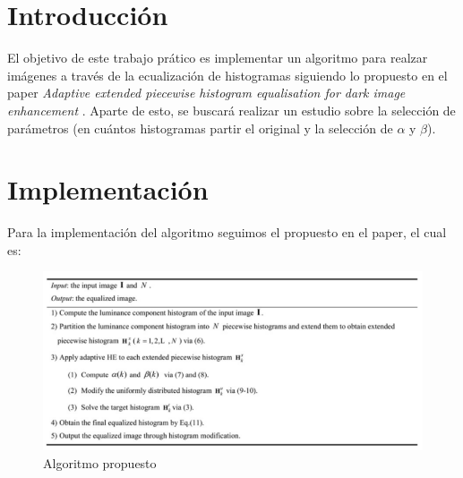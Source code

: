 \documentclass[10pt, a4paper]{article}
\begin{document}




\maketitle
\tableofcontents

\newpage

\section{Introducción}

El objetivo de este trabajo prático es implementar un algoritmo para realzar imágenes a través de la ecualización de histogramas siguiendo lo propuesto en el paper \textit{Adaptive extended piecewise histogram equalisation for dark image enhancement} \cite{paper}. Aparte de esto, se buscará realizar un estudio sobre la selección de parámetros (en cuántos histogramas partir el original y la selección de $\alpha$ y  $\beta$).

\section{Implementación}

Para la implementación del algoritmo seguimos el propuesto en el paper, el cual es:

\begin{figure}[H]
	\centering
    \includegraphics[width=\textwidth]{algoPaper.png}
    \caption{Algoritmo propuesto}
\end{figure}
\end{document}
